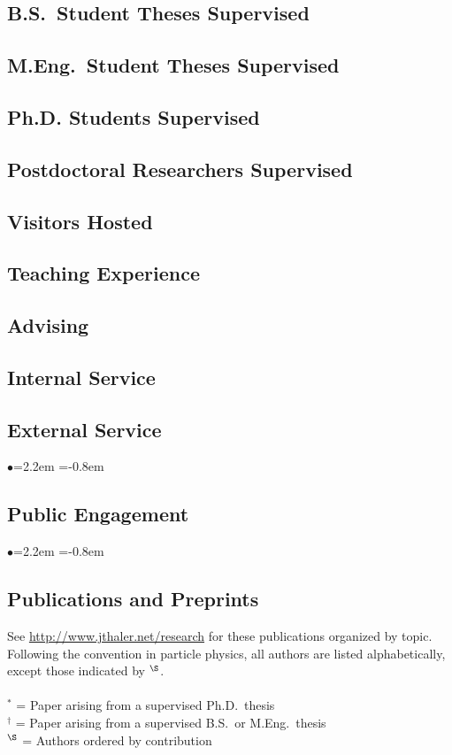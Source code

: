\documentclass[11pt]{article}
\newcommand{\heading}[1]{\vspace{0in}\subsection*{#1} \vspace{.02in}}
\newcommand{\bbl}{\begin{list}{$\bullet$}{\leftmargin=2.2em \itemsep=-1pt \itemindent=-0.8em}}
\newcommand{\el}{\end{list}}
\begin{document}

\heading{B.S.\ Student Theses Supervised}



\heading{M.Eng.\ Student Theses Supervised}



\heading{Ph.D. Students Supervised}



\heading{Postdoctoral Researchers Supervised}



\heading{Visitors Hosted}



\heading{Teaching Experience}



\heading{Advising}



\heading{Internal Service}



\heading{External Service}

\bbl


\el


\heading{Public Engagement}

\bbl

\el



\heading{Publications and Preprints}

See \url{http://www.jthaler.net/research} for these publications organized by topic.  Following the convention in particle physics, all authors are listed alphabetically, except those indicated by ${}^\S$. \\
~\\
\noindent ${}^\ast$ = Paper arising from a supervised Ph.D.\ thesis\\
\noindent ${}^\dagger$ = Paper arising from a supervised B.S.\ or M.Eng.\ thesis\\
\noindent ${}^\S$ = Authors ordered by contribution\\
\end{document}
